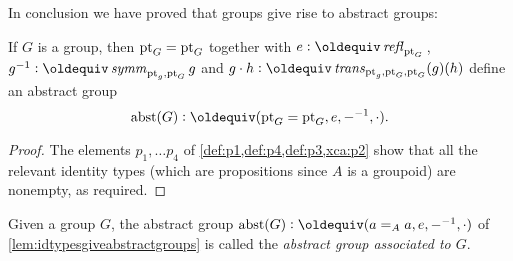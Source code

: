 In conclusion we have proved that groups give rise to abstract groups:
  \begin{lemma}\label{lem:idtypesgiveabstractgroups}
    If $G$ is a group, then ${\mathord{\mathrm{pt}}}_G={\mathord{\mathrm{pt}}}_G$ together with $e\defequi\refl{\pt_G}{}$, $g^{-1}\defequi\symm_{\pt_g,\pt_G}g$ and $g\cdot h\defequi\trans_{\pt_g,\pt_G,\pt_G}(g)(h)$
define an abstract group
$$\abstr(G)\defequi (\pt_G=\pt_G,e,{-}^{-1},\cdot).$$
  \end{lemma}
  \begin{proof}
    The elements $p_1,\dots p_4$ of \cref{def:p1,def:p4,def:p3,xca:p2} show that all the relevant identity types (which are propositions since $A$ is a groupoid) are nonempty, as required.
  \end{proof}
  \begin{definition}\label{def:abstrG}
    Given a group $G$, the abstract group $\abstr(G)\defequi (a=_Aa,e,{-}^{-1},\cdot)$ of \cref{lem:idtypesgiveabstractgroups} is called the \emph{abstract group associated to $G$}.
  \end{definition}

